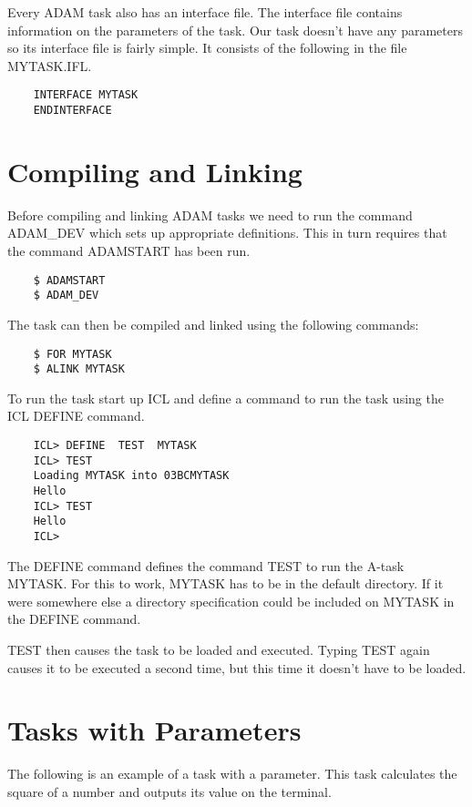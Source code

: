 \documentclass[twoside,11pt]{report}
\newcommand{\xlabel}[1]{}
\begin{document}
Every ADAM task also has an interface file. The interface file contains
information on the parameters of the task. Our task doesn't have any parameters
so its interface file is fairly simple. It consists of the following in
the file MYTASK.IFL.

\begin{verbatim}
    INTERFACE MYTASK
    ENDINTERFACE
\end{verbatim}

\section{\xlabel{compiling_and_linking}Compiling and Linking}

Before compiling and linking ADAM tasks we need to run the command ADAM\_DEV
which sets up appropriate definitions. This in turn requires
that the command ADAMSTART has been run.

\begin{verbatim}
    $ ADAMSTART
    $ ADAM_DEV
\end{verbatim}

The task can then be compiled and linked using the following commands:

\begin{verbatim}
    $ FOR MYTASK
    $ ALINK MYTASK
\end{verbatim}

To run the task start up ICL and define a command to run the task using
the ICL DEFINE command.

\begin{verbatim}
    ICL> DEFINE  TEST  MYTASK
    ICL> TEST
    Loading MYTASK into 03BCMYTASK
    Hello
    ICL> TEST
    Hello
    ICL>
\end{verbatim}
The DEFINE command defines the command TEST to run the A-task MYTASK. For
this to work, MYTASK has to be in the default directory. If it were somewhere
else a directory specification could be included on MYTASK in the DEFINE
command.

TEST then causes the task to be loaded and executed. Typing TEST again causes
it to be executed a second time, but this time it doesn't have to be loaded.

\section{\xlabel{tasks_with_parameters}Tasks with Parameters}

The following is an example of a task with a parameter. This task calculates
the square of a number and outputs its value on the terminal.
\end{document}
